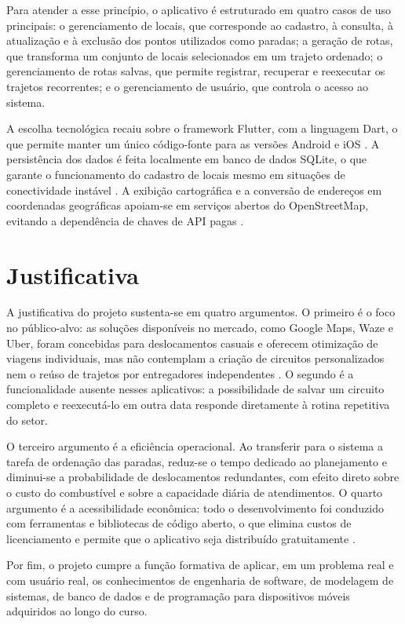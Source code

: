 Para atender a esse princípio, o aplicativo é estruturado em quatro casos de uso principais: o gerenciamento de locais, que corresponde ao cadastro, à consulta, à atualização e à exclusão dos pontos utilizados como paradas; a geração de rotas, que transforma um conjunto de locais selecionados em um trajeto ordenado; o gerenciamento de rotas salvas, que permite registrar, recuperar e reexecutar os trajetos recorrentes; e o gerenciamento de usuário, que controla o acesso ao sistema.

A escolha tecnológica recaiu sobre o framework Flutter, com a linguagem Dart, o que permite manter um único código-fonte para as versões Android e iOS \cite{flutter2024}. A persistência dos dados é feita localmente em banco de dados SQLite, o que garante o funcionamento do cadastro de locais mesmo em situações de conectividade instável \cite{sqlite2024}. A exibição cartográfica e a conversão de endereços em coordenadas geográficas apoiam-se em serviços abertos do OpenStreetMap, evitando a dependência de chaves de API pagas \cite{osm2024}.

\section{Justificativa}

A justificativa do projeto sustenta-se em quatro argumentos. O primeiro é o foco no público-alvo: as soluções disponíveis no mercado, como Google Maps, Waze e Uber, foram concebidas para deslocamentos casuais e oferecem otimização de viagens individuais, mas não contemplam a criação de circuitos personalizados nem o reúso de trajetos por entregadores independentes \cite{sriVisao2025}. O segundo é a funcionalidade ausente nesses aplicativos: a possibilidade de salvar um circuito completo e reexecutá-lo em outra data responde diretamente à rotina repetitiva do setor.

O terceiro argumento é a eficiência operacional. Ao transferir para o sistema a tarefa de ordenação das paradas, reduz-se o tempo dedicado ao planejamento e diminui-se a probabilidade de deslocamentos redundantes, com efeito direto sobre o custo do combustível e sobre a capacidade diária de atendimentos. O quarto argumento é a acessibilidade econômica: todo o desenvolvimento foi conduzido com ferramentas e bibliotecas de código aberto, o que elimina custos de licenciamento e permite que o aplicativo seja distribuído gratuitamente \cite{redhatOpenSource2024}.

Por fim, o projeto cumpre a função formativa de aplicar, em um problema real e com usuário real, os conhecimentos de engenharia de software, de modelagem de sistemas, de banco de dados e de programação para dispositivos móveis adquiridos ao longo do curso.

